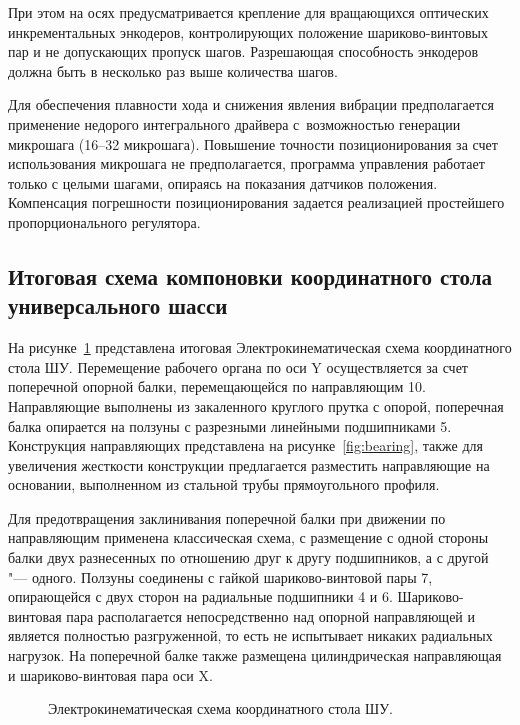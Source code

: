 При этом на осях предусматривается крепление для вращающихся оптических инкрементальных энкодеров, контролирующих положение шариково-винтовых пар и не допускающих пропуск шагов. Разрешающая способность энкодеров должна быть в несколько раз выше количества шагов.

Для обеспечения плавности хода и снижения явления вибрации предполагается применение недорого интегрального драйвера с~возможностью генерации микрошага (16--32 микрошага). Повышение точности позиционирования за счет использования микрошага не предполагается, программа управления работает только с целыми шагами, опираясь на показания датчиков положения. Компенсация погрешности позиционирования задается реализацией простейшего пропорционального регулятора.

\subsection{Итоговая схема компоновки координатного стола универсального шасси}

На рисунке~\cref{fig:scheme} представлена итоговая Электрокинематическая схема координатного стола ШУ. Перемещение рабочего органа по оси Y осуществляется за счет поперечной опорной балки, перемещающейся по направляющим 10. Направляющие выполнены из закаленного круглого прутка с опорой, поперечная балка опирается на ползуны с разрезными линейными подшипниками 5. Конструкция направляющих представлена на рисунке~\cref{fig:bearing}, также для увеличения жесткости конструкции предлагается разместить направляющие на основании, выполненном из стальной трубы прямоугольного профиля.

Для предотвращения заклинивания поперечной балки при движении по направляющим применена классическая схема, с размещение с одной стороны балки двух разнесенных по отношению друг к другу подшипников, а с другой "--- одного. Ползуны соединены с гайкой шариково-винтовой пары 7, опирающейся с двух сторон на радиальные подшипники 4 и 6. Шариково-винтовая пара располагается непосредственно над опорной направляющей и является полностью разгруженной, то есть не испытывает никаких радиальных нагрузок. На поперечной балке также размещена цилиндрическая направляющая и шариково-винтовая пара оси X.

\begin{figure}[ht]
	\caption{Электрокинематическая схема координатного стола ШУ.}\label{fig:scheme}
\end{figure}

